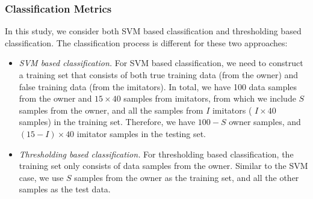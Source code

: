\subsubsection{Classification Metrics}
In this study, we consider both SVM based classification and thresholding 
based classification. The classification process is different for these two 
approaches:

\begin{itemize}
\item \emph{SVM based classification.} For SVM based classification, we need 
to construct a training set that consists of both true training data (from the 
owner) and false training data (from the imitators). In total, we have 100 
data samples from the owner and $15 \times 40$ samples from imitators, from 
which we include $S$ samples from the owner, and all the samples from $I$ 
imitators ( $I \times 40$ samples) in the training set. Therefore, we have 
$100-S$ owner samples, and $(15-I)\times 40$ imitator samples in the testing 
set.


\item \emph{Thresholding based classification.} For thresholding based 
classification, the training set only consists of data samples from the owner. 
Similar to the SVM case, we use $S$ samples from the owner as the training 
set, and all the other samples as the test data.
\end{itemize}

